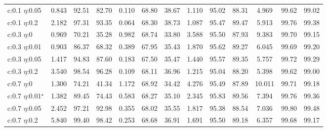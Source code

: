\begin{table}[t]
\begin{tabular}{lccc|ccc|ccc|ccc}
c:0.1 $\eta$:0.05
& 0.843 & 92.51 & 82.70
& 0.110 & 68.80 & 38.67
& 1.110 & 95.02 & 88.31
& 4.969 & 99.62 & 99.02 \\

c:0.1 $\eta$:0.2
& 2.182 & 97.31 & 93.35
& 0.064 & 68.30 & 38.73
& 1.087 & 95.47 & 89.47
& 5.913 & 99.76 & 99.38 \\
\midrule

c:0.3 $\eta$:0
& 0.969 & 70.21 & 35.28
& 0.982 & 68.74 & 33.80
& 3.588 & 95.50 & 87.93
& 9.383 & 99.70 & 99.15 \\

c:0.3 $\eta$:0.01
& 0.903 & 86.37 & 68.32
& 0.389 & 67.95 & 35.43
& 1.870 & 95.62 & 89.27
& 6.045 & 99.69 & 99.20 \\

c:0.3 $\eta$:0.05
& 1.417 & 94.83 & 87.60
& 0.183 & 67.50 & 35.47
& 1.440 & 95.57 & 89.35
& 5.757 & 99.72 & 99.29 \\

c:0.3 $\eta$:0.2
& 3.540 & 98.54 & 96.28
& 0.109 & 68.11 & 36.96
& 1.215 & 95.04 & 88.20
& 5.398 & 99.62 & 99.00 \\
\midrule

c:0.7 $\eta$:0
& 1.300 & 74.21 & 41.34
& 1.172 & 68.92 & 34.42
& 4.276 & 95.49 & 87.89
& 10.011 & 99.71 & 99.18 \\

c:0.7 $\eta$:0.01$^{\star}$
& 1.382 & 89.45 & 74.43
& 0.583 & 68.27 & 35.10
& 2.345 & 95.83 & 89.56
& 7.394 & 99.76 & 99.36 \\

c:0.7 $\eta$:0.05
& 2.452 & 97.21 & 92.98
& 0.355 & 68.02 & 35.55
& 1.817 & 95.38 & 88.54
& 7.036 & 99.80 & 99.48 \\

c:0.7 $\eta$:0.2
& 5.840 & 99.40 & 98.42
& 0.253 & 68.68 & 36.91
& 1.691 & 95.50 & 89.18
& 6.357 & 99.68 & 99.17 \\
\bottomrule
\end{tabular}%


\end{table}
